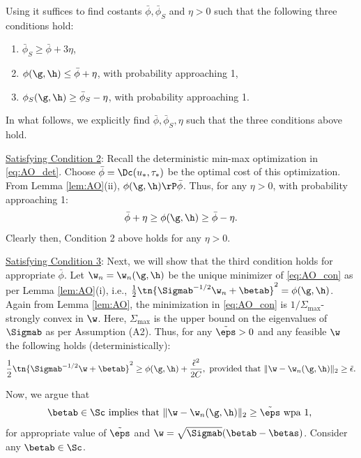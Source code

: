  Using \cite[Theorem 6.1(iii)]{thrampoulidis2018precise} it suffices to find costants $\bar\phi, \bar\phi_S$ and $\eta>0$ such that the following three conditions hold:
\begin{enumerate}
\item $\bar\phi_S \geq \bar\phi + 3\eta$,
\item $\phi(\g,\h) \leq \bar\phi + \eta$, with probability approaching 1,
\item $\phi_S(\g,\h) \geq \bar\phi_S - \eta$, with probability approaching 1.
\end{enumerate}
In what follows, we  explicitly find $\bar\phi, \bar\phi_S,\eta$ such that the three conditions above hold.

\vspace{5pt}
\noindent\underline{Satisfying Condition 2}: Recall the deterministic min-max optimization in \eqref{eq:AO_det}. Choose $\bar\phi=\Dc(u_*,\tau_*)$ be the optimal cost of this optimization. From Lemma \ref{lem:AO}(ii), $\phi(\g,\h)\rP\bar\phi$. Thus, for any $\eta>0$, with probability approaching 1:
\begin{align}\label{eq:phi_lim}
\bar\phi + \eta \geq \phi(\g,\h) \geq \bar\phi - \eta.
\end{align}
Clearly then, Condition 2 above holds for any $\eta>0$. 

\vspace{5pt}
\noindent\underline{Satisfying Condition 3}: Next, we will show that the third condition holds for appropriate $\bar\phi$. 
Let $\w_n=\w_n(\g,\h)$ be the unique minimizer of \eqref{eq:AO_con} as per Lemma \ref{lem:AO}(i), i.e., $\frac{1}{2}\tn{\Sigmab^{-1/2}\w_n+\betab}^2 = \phi(\g,\h)$. Again from Lemma \ref{lem:AO}, the minimization in \eqref{eq:AO_con} is $1/\Sigma_{\max}$-strongly convex in $\w$. Here, $\Sigma_{\max}$ is the upper bound on the eigenvalues of $\Sigmab$ as per Assumption (A2). Thus, for any $\tilde\eps>0$ and any feasible $\w$ the following holds (deterministically):
\begin{align}\label{eq:sc}
\frac{1}{2}\tn{\Sigmab^{-1/2}\w+\betab}^2 \geq \phi(\g,\h) + \frac{\tilde\epsilon^2}{2C},~\text{provided that}~ \|\w-\w_n(\g,\h)\|_2 \geq \tilde\epsilon.
\end{align}

Now, we argue that 
\begin{align}\label{eq:dev_arg}
\betab\in\Sc \text{ implies that } \|\w-\w_n(\g,\h)\|_2\geq \tilde\eps \text{ wpa 1, }
\end{align}
for 
appropriate value of $\tilde\eps$ and $\w=\sqrt{\Sigmab}(\betab-\betas)$. 
Consider any $\betab\in\Sc$. 


